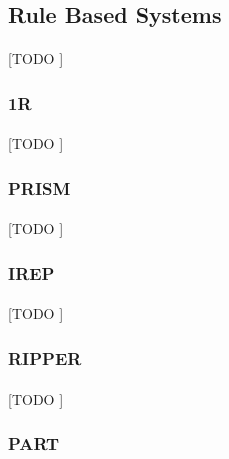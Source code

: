 \documentclass{article}
\begin{document}
		\subsection{Rule Based Systems}
		\label{sec:decision-trees}

			\paragraph{}
			[TODO ]

			\subsubsection{1R}
			\label{sec:1r-rule-based}

				\paragraph{}
				[TODO ]

			\subsubsection{PRISM}
			\label{sec:prism-rule-based}

				\paragraph{}
				[TODO ]

			\subsubsection{IREP}
			\label{sec:irep-rule-based}

				\paragraph{}
				[TODO ]

			\subsubsection{RIPPER}
			\label{sec:ripper-rule-based}

				\paragraph{}
				[TODO ]

			\subsubsection{PART}
			\label{sec:part-rule-based}
\end{document}
